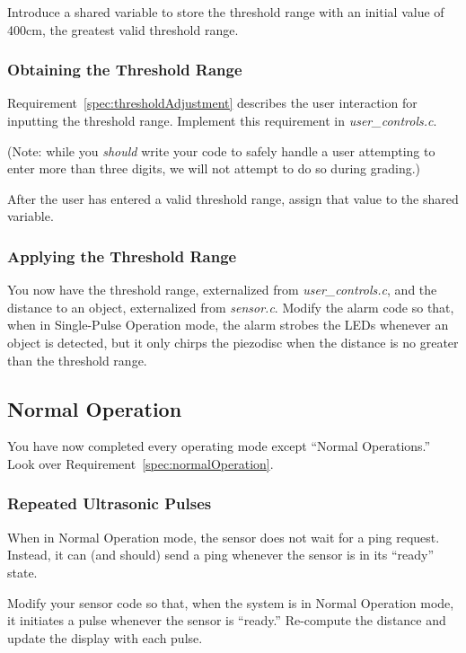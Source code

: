 Introduce a shared variable to store the threshold range with an initial value of 400cm, the greatest valid threshold range.

\subsubsection{Obtaining the Threshold Range} \label{subsubsec:obtainingThreshold}

Requirement~\ref{spec:thresholdAdjustment} describes the user interaction for inputting the threshold range.
Implement this requirement in \textit{user\_controls.c}.

(Note: while you \textit{should} write your code to safely handle a user attempting to enter more than three digits, we will not attempt to do so during grading.)

After the user has entered a valid threshold range, assign that value to the shared variable.

\subsubsection{Applying the Threshold Range} \label{subsubsec:applyingThreshold}

You now have the threshold range, externalized from \textit{user\_controls.c}, and the distance to an object, externalized from \textit{sensor.c}.
Modify the alarm code so that, when in Single-Pulse Operation mode, the alarm strobes the LEDs whenever an object is detected, but it only chirps the piezodisc when the distance is no greater than the threshold range.

\subsection{Normal Operation}

You have now completed every operating mode except ``Normal Operations.''
Look over Requirement~\ref{spec:normalOperation}.

\subsubsection{Repeated Ultrasonic Pulses} \label{subsubsec:repeatedPulses}

When in Normal Operation mode, the sensor does not wait for a ping request.
Instead, it can (and should) send a ping whenever the sensor is in its ``ready'' state.

Modify your sensor code so that, when the system is in Normal Operation mode, it initiates a pulse whenever the sensor is ``ready.''
Re-compute the distance and update the display with each pulse.

